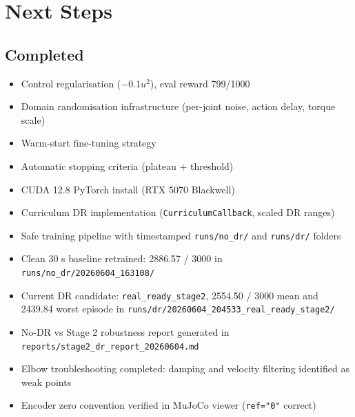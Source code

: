 \documentclass[12pt,a4paper]{article}
\begin{document}
\section{Next Steps}

\subsection{Completed}
\begin{itemize}
    \item[$\checkmark$] Control regularisation ($-0.1u^2$), eval reward 799/1000
    \item[$\checkmark$] Domain randomisation infrastructure (per-joint noise, action delay, torque scale)
    \item[$\checkmark$] Warm-start fine-tuning strategy
    \item[$\checkmark$] Automatic stopping criteria (plateau + threshold)
    \item[$\checkmark$] CUDA 12.8 PyTorch install (RTX 5070 Blackwell)
    \item[$\checkmark$] Curriculum DR implementation (\texttt{CurriculumCallback}, scaled DR ranges)
    \item[$\checkmark$] Safe training pipeline with timestamped \texttt{runs/no\_dr/} and \texttt{runs/dr/} folders
    \item[$\checkmark$] Clean 30 s baseline retrained: 2886.57 / 3000 in \texttt{runs/no\_dr/20260604\_163108/}
    \item[$\checkmark$] Current DR candidate: \texttt{real\_ready\_stage2}, 2554.50 / 3000 mean and 2439.84 worst episode in \texttt{runs/dr/20260604\_204533\_real\_ready\_stage2/}
    \item[$\checkmark$] No-DR vs Stage 2 robustness report generated in \texttt{reports/stage2\_dr\_report\_20260604.md}
    \item[$\checkmark$] Elbow troubleshooting completed: damping and velocity filtering identified as weak points
    \item[$\checkmark$] Encoder zero convention verified in MuJoCo viewer (\texttt{ref="0"} correct)
\end{itemize}
\end{document}
